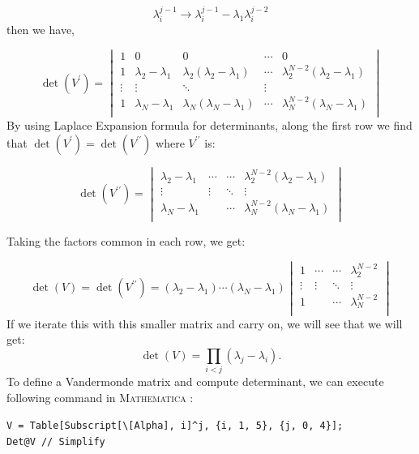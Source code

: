 \documentclass[11pt]{article}
\newcommand{\MA}{\textsc{Mathematica }}
\begin{document}
\begin{equation}
	\lambda_{i}^{j-1} \to \lambda_{i}^{j-1} - \lambda_{1} \lambda_{i}^{j-2}
\end{equation}
then we have, 

\begin{equation}
	\det(V^{\prime}) = 
	\begin{vmatrix}
		1 & 0 & 0 & \cdots & 0 \\
		1 & \lambda_2 - \lambda_1 & \lambda_2(\lambda_2 - \lambda_1) & \cdots & \lambda_2^{N-2}(\lambda_2 - \lambda_1) \\ 
		\vdots  & \vdots  & \ddots & \vdots  \\
		1 & \lambda_N - \lambda_1 & \lambda_N(\lambda_N - \lambda_1) & \cdots & \lambda_N^{N-2}(\lambda_N - \lambda_1) \\
	\end{vmatrix}
\end{equation}
By using Laplace Expansion formula for determinants, along the first row we find that $\det(V^{\prime}) = \det(V^{\prime\prime})$ where $V^{\prime\prime}$ is:

\begin{equation}
	\det(V^{\prime\prime}) = 
	\begin{vmatrix}
		 \lambda_2 - \lambda_1 & \cdots & \cdots & \lambda_2^{N-2}(\lambda_2 - \lambda_1) \\ 
		\vdots  & \vdots  & \ddots & \vdots  \\
		\lambda_N - \lambda_1 &  & \cdots &  \lambda_N^{N-2}(\lambda_N - \lambda_1) \\
	\end{vmatrix}
\end{equation}

Taking the factors common in each row, we get:

\begin{equation}
	\det(V) = \det(V^{\prime\prime}) = 
	(\lambda_2 - \lambda_1) \cdots (\lambda_N - \lambda_1)
	\begin{vmatrix}
		1 & \cdots & \cdots & \lambda_2^{N-2} \\ 
		\vdots  & \vdots  & \ddots & \vdots  \\
		1 &  & \cdots &  \lambda_N^{N-2} \\
	\end{vmatrix}
\end{equation}
If we iterate this with this smaller matrix and carry on, we will see that we will get:
\begin{equation}
	\det(V) = \prod_{i<j} (\lambda_j - \lambda_i).
\end{equation}
To define a Vandermonde matrix and compute determinant, we can execute following command in \MA:
\begin{mdframed}[backgroundcolor=magenta!2]
	\begin{footnotesize} 
		\verb"V = Table[Subscript[\[Alpha], i]^j, {i, 1, 5}, {j, 0, 4}];"\\ 
		\verb"Det@V // Simplify"
	\end{footnotesize} 
\end{mdframed}
\end{document}
